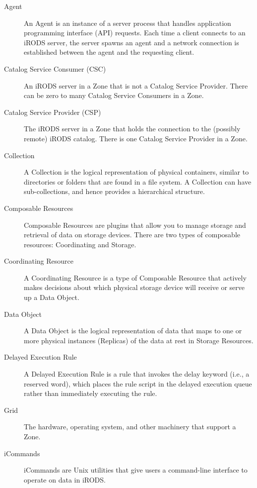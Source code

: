 \documentclass[10pt,oneside]{memoir}
\begin{document}
\begin{description}

\item [Agent]
An Agent is an instance of a server process that handles application programming interface (API) requests. Each time a client connects to an iRODS server, the server spawns an agent and a network connection is established between the agent and the requesting client.

\item [Catalog Service Consumer (CSC)]
An iRODS server in a Zone that is not a Catalog Service Provider. There can be zero to many Catalog Service Consumers in a Zone.

\item [Catalog Service Provider (CSP)]
The iRODS server in a Zone that holds the connection to the (possibly remote) iRODS catalog. There is one Catalog Service Provider in a Zone.

\item [Collection]
A Collection is the logical representation of physical containers, similar to directories or folders that are found in a file system. A Collection can have sub-collections, and hence provides a hierarchical structure.

\item [Composable Resources]
Composable Resources are plugins that allow you to manage storage and retrieval of data on storage devices. There are two types of composable resources: Coordinating and Storage.

\item [Coordinating Resource]
A Coordinating Resource is a type of Composable Resource that actively makes decisions about which physical storage device will receive or serve up a Data Object.

\item [Data Object]
A Data Object is the logical representation of data that maps to one or more physical instances (Replicas) of the data at rest in Storage Resources.

\item [Delayed Execution Rule]
A Delayed Execution Rule is a rule that invokes the delay keyword (i.e., a reserved word), which places the rule script in the delayed execution queue rather than immediately executing the rule.

\item [Grid]
The hardware, operating system, and other machinery that support a Zone.

\item [iCommands]
iCommands are Unix utilities that give users a command-line interface to operate on data in iRODS.


\end{description}
\end{document}
